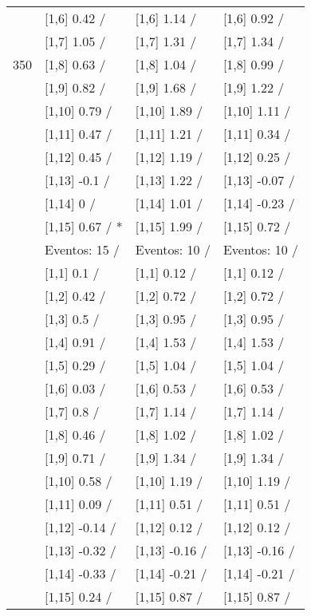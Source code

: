 \begin{table}
\begin{tabular}[t]{llll}
 & {}[1,6] 0.42  / & {}[1,6] 1.14  / & {}[1,6] 0.92  /\\
 & {}[1,7] 1.05  / & {}[1,7] 1.31  / & {}[1,7] 1.34  /\\
350 & {}[1,8] 0.63  / & {}[1,8] 1.04  / & {}[1,8] 0.99  /\\
\addlinespace
 & {}[1,9] 0.82  / & {}[1,9] 1.68  / & {}[1,9] 1.22  /\\
 & {}[1,10] 0.79  / & {}[1,10] 1.89  / & {}[1,10] 1.11  /\\
 & {}[1,11] 0.47  / & {}[1,11] 1.21  / & {}[1,11] 0.34  /\\
 & {}[1,12] 0.45  / & {}[1,12] 1.19  / & {}[1,12] 0.25  /\\
 & {}[1,13] -0.1  / & {}[1,13] 1.22  / & {}[1,13] -0.07  /\\
\addlinespace
 & {}[1,14] 0  / & {}[1,14] 1.01  / & {}[1,14] -0.23  /\\
 & {}[1,15] 0.67  / * & {}[1,15] 1.99  / & {}[1,15] 0.72  /\\
 & Eventos:  15 / & Eventos:  10 / & Eventos:  10 /\\
 & {}[1,1] 0.1  / & {}[1,1] 0.12  / & {}[1,1] 0.12  /\\
 & {}[1,2] 0.42  / & {}[1,2] 0.72  / & {}[1,2] 0.72  /\\
\addlinespace
 & {}[1,3] 0.5  / & {}[1,3] 0.95  / & {}[1,3] 0.95  /\\
 & {}[1,4] 0.91  / & {}[1,4] 1.53  / & {}[1,4] 1.53  /\\
 & {}[1,5] 0.29  / & {}[1,5] 1.04  / & {}[1,5] 1.04  /\\
 & {}[1,6] 0.03  / & {}[1,6] 0.53  / & {}[1,6] 0.53  /\\
 & {}[1,7] 0.8  / & {}[1,7] 1.14  / & {}[1,7] 1.14  /\\
\addlinespace
500 & {}[1,8] 0.46  / & {}[1,8] 1.02  / & {}[1,8] 1.02  /\\
 & {}[1,9] 0.71  / & {}[1,9] 1.34  / & {}[1,9] 1.34  /\\
 & {}[1,10] 0.58  / & {}[1,10] 1.19  / & {}[1,10] 1.19  /\\
 & {}[1,11] 0.09  / & {}[1,11] 0.51  / & {}[1,11] 0.51  /\\
 & {}[1,12] -0.14  / & {}[1,12] 0.12  / & {}[1,12] 0.12  /\\
\addlinespace
 & {}[1,13] -0.32  / & {}[1,13] -0.16  / & {}[1,13] -0.16  /\\
 & {}[1,14] -0.33  / & {}[1,14] -0.21  / & {}[1,14] -0.21  /\\
 & {}[1,15] 0.24  / & {}[1,15] 0.87  / & {}[1,15] 0.87  /\\
\bottomrule
\end{tabular}
\end{table}

